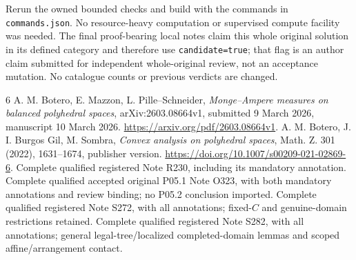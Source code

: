\documentclass[11pt]{article}
\begin{document}
Rerun the owned bounded checks and build with the commands in \texttt{commands.json}. No resource-heavy computation or supervised compute facility was needed. The final proof-bearing local notes claim this whole original solution in its defined category and therefore use \texttt{candidate=true}; that flag is an author claim submitted for independent whole-original review, not an acceptance mutation. No catalogue counts or previous verdicts are changed.

\begin{thebibliography}{6}
 A. M. Botero, E. Mazzon, L. Pille--Schneider, \emph{Monge--Ampere measures on balanced polyhedral spaces}, arXiv:2603.08664v1, submitted 9 March 2026, manuscript 10 March 2026. \url{https://arxiv.org/pdf/2603.08664v1}.
 A. M. Botero, J. I. Burgos Gil, M. Sombra, \emph{Convex analysis on polyhedral spaces}, Math. Z. 301 (2022), 1631--1674, publisher version. \url{https://doi.org/10.1007/s00209-021-02869-6}.
 Complete qualified registered Note R230, including its mandatory annotation.
 Complete qualified accepted original P05.1 Note O323, with both mandatory annotations and review binding; no P05.2 conclusion imported.
 Complete qualified registered Note S272, with all annotations; fixed-$C$ and genuine-domain restrictions retained.
 Complete qualified registered Note S282, with all annotations; general legal-tree/localized completed-domain lemmas and scoped affine/arrangement contact.
\end{thebibliography}
\end{document}

